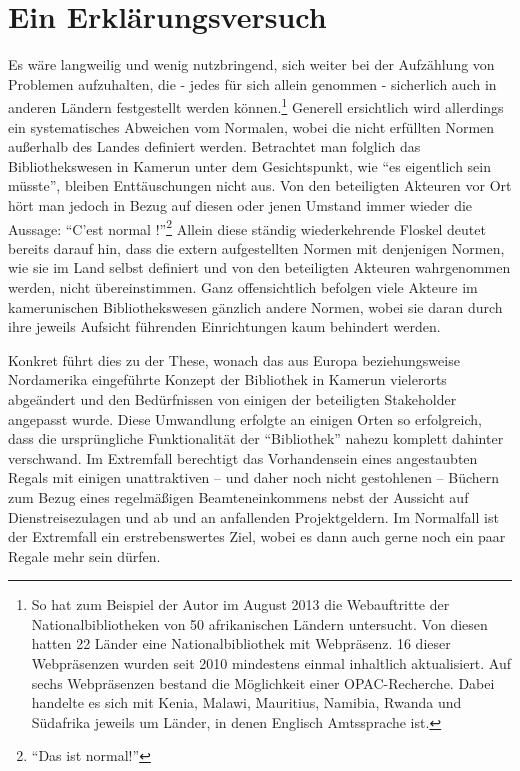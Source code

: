 \documentclass[a4paper,
fontsize=11pt,
oneside,
numbers=noperiodatend,
parskip=half-,
bibliography=totoc,
final
]{scrartcl}
\begin{document}
\section*{Ein Erklärungsversuch}\label{ein-erkluxe4rungsversuch}

Es wäre langweilig und wenig nutzbringend, sich weiter bei der
Aufzählung von Problemen aufzuhalten, die - jedes für sich allein
genommen - sicherlich auch in anderen Ländern festgestellt werden
können.\footnote{So hat zum Beispiel der Autor im August 2013 die
  Webauftritte der Nationalbibliotheken von 50 afrikanischen Ländern
  untersucht. Von diesen hatten 22 Länder eine Nationalbibliothek mit
  Webpräsenz. 16 dieser Webpräsenzen wurden seit 2010 mindestens einmal
  inhaltlich aktualisiert. Auf sechs Webpräsenzen bestand die
  Möglichkeit einer OPAC-Recherche. Dabei handelte es sich mit Kenia,
  Malawi, Mauritius, Namibia, Rwanda und Südafrika jeweils um Länder, in
  denen Englisch Amtssprache ist.} Generell ersichtlich wird allerdings
ein systematisches Abweichen vom Normalen, wobei die nicht erfüllten
Normen außerhalb des Landes definiert werden. Betrachtet man folglich
das Bibliothekswesen in Kamerun unter dem Gesichtspunkt, wie \enquote{es
eigentlich sein müsste}, bleiben Enttäuschungen nicht aus. Von den
beteiligten Akteuren vor Ort hört man jedoch in Bezug auf diesen oder
jenen Umstand immer wieder die Aussage: \enquote{C'est normal
!}\footnote{\enquote{Das ist normal!}} Allein diese ständig
wiederkehrende Floskel deutet bereits darauf hin, dass die extern
aufgestellten Normen mit denjenigen Normen, wie sie im Land selbst
definiert und von den beteiligten Akteuren wahrgenommen werden, nicht
übereinstimmen. Ganz offensichtlich befolgen viele Akteure im
kamerunischen Bibliothekswesen gänzlich andere Normen, wobei sie daran
durch ihre jeweils Aufsicht führenden Einrichtungen kaum behindert
werden.

Konkret führt dies zu der These, wonach das aus Europa beziehungsweise
Nordamerika eingeführte Konzept der Bibliothek in Kamerun vielerorts
abgeändert und den Bedürfnissen von einigen der beteiligten Stakeholder
angepasst wurde. Diese Umwandlung erfolgte an einigen Orten so
erfolgreich, dass die ursprüngliche Funktionalität der
\enquote{Bibliothek} nahezu komplett dahinter verschwand. Im Extremfall
berechtigt das Vorhandensein eines angestaubten Regals mit einigen
unattraktiven -- und daher noch nicht gestohlenen -- Büchern zum Bezug
eines regelmäßigen Beamteneinkommens nebst der Aussicht auf
Dienstreisezulagen und ab und an anfallenden Projektgeldern. Im
Normalfall ist der Extremfall ein erstrebenswertes Ziel, wobei es dann
auch gerne noch ein paar Regale mehr sein dürfen.
\end{document}
